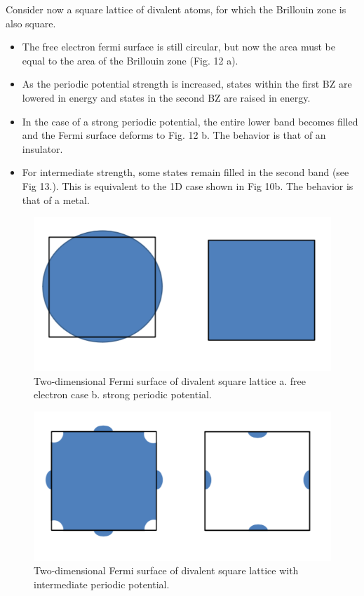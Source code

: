 \documentclass[10pt]{article}
\begin{document}
Consider now a square lattice of divalent atoms, for which the Brillouin zone is also square.
\begin{itemize}
  \item The free electron fermi surface is still circular, but now the area must be equal to the area of the Brillouin zone (Fig. 12 a).
  \item As the periodic potential strength is increased, states within the first BZ are lowered in energy and states in the second BZ are raised
  in energy.
  \item In the case of a strong periodic potential, the entire lower band becomes filled and the Fermi surface deforms to Fig. 12 b. The behavior is
  that of an insulator.
  \item For intermediate strength, some states remain filled in the second band (see Fig 13.). This is equivalent to the 1D case shown in Fig 10b. The
  behavior is that of a metal.
\end{itemize}


  \begin{figure}
    \centering
      \includegraphics[width=\textwidth]{tb12}
      \caption{Two-dimensional Fermi surface of divalent square lattice a. free electron case b. strong periodic potential.}
  \end{figure}


\begin{figure}
  \centering
    \includegraphics[width=\textwidth]{tb13}
    \caption{Two-dimensional Fermi surface of divalent square lattice with intermediate periodic potential.}
\end{figure}
\end{document}
